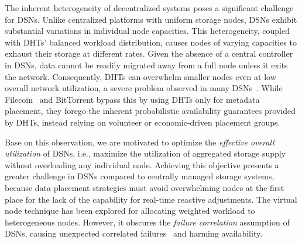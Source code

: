The inherent heterogeneity of decentralized systems poses a significant challenge for DSNs.
Unlike centralized platforms with uniform storage nodes, DSNs exhibit substantial variations in individual node capacities.
This heterogeneity, coupled with DHTs' balanced workload distribution, causes nodes of varying capacities to exhaust their storage at different rates.
Given the absence of a central controller in DSNs, data cannot be readily migrated away from a full node unless it exits the network.
Consequently, DHTs can overwhelm smaller nodes even at low overall network utilization, a severe problem observed in many DSNs~\cite{kubiatowicz2000oceanstore,ratnasamy2001scalable,haeberlen2005glacier,team2021swarm}.
While Filecoin~\cite{filecoin} and BitTorrent bypass this by using DHTs only for metadata placement, they forego the inherent probabilistic availability guarantees provided by DHTs, instead relying on volunteer or economic-driven placement groups.

Base on this observation, we are motivated to optimize the \emph{effective overall utilization} of DSNs, i.e., maximize the utilization of aggregated storage supply without overloading any individual node.
Achieving this objective presents a greater challenge in DSNs compared to centrally managed storage systems, because data placement strategies must avoid overwhelming nodes at the first place for the lack of the capability for real-time reactive adjustments.
The virtual node technique has been explored for allocating weighted workload to heterogeneous nodes.
However, it obscures the \emph{failure correlation} assumption of DSNs, causing unexpected correlated failures~\cite{filecoin_loss} and harming availability.

